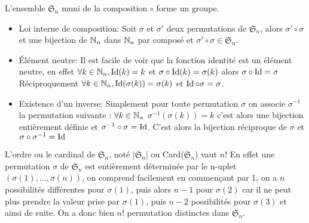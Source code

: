 \begin{prop}
    L'ensemble $\mathfrak{S}_n$ muni de la composition $\circ$ forme un groupe.
\tcblower
\begin{itemize}
\item Loi interne de composition: Soit $\sigma$ et $\sigma'$ deux permutations de $\mathfrak{S}_n$,
alors $\sigma'\circ\sigma$ et une bijection de $\mathbb{N}_n$ dans $\mathbb{N}_n$ par composé et $\sigma'\circ\sigma\in\mathfrak{S}_n$.

\item Élément neutre: Il est facile de voir que la fonction identité est un élément neutre, en effet $\forall k \in \mathbb{N}_n,\operatorname{Id}(k)=k$ et $\sigma\circ\operatorname{Id}(k)=\sigma(k)$ alors $\sigma\circ\operatorname{Id}=\sigma$
Réciproquement $\forall k \in \mathbb{N}_n,\operatorname{Id}(\sigma(k))=\sigma(k)$ et $\operatorname{Id}\circ\sigma=\sigma$.

\item Existence d'un inverse: Simplement pour toute permutation $\sigma$ on associe $\sigma^{-1}$ la permutation suivante : $\forall k \in \mathbb{N}_n$ $\sigma^{-1}(\sigma(k))=k$ c'est alors une bijection entièrement définie et $\sigma^{-1}\circ\sigma=\operatorname{Id}$. C'est alors la bijection réciproque de $\sigma$ et $\sigma\circ\sigma^{-1}=\operatorname{Id}$
\end{itemize}
\end{prop}

\begin{prop}
L'ordre ou le cardinal de $\mathfrak{S}_n$, noté $\vert \mathfrak{S}_n \vert$ ou Card($\mathfrak{S}_n$) vaut $n!$
\tcblower
En effet une permutation $\sigma$ de $\mathfrak{S}_n$ est entièrement déterminée par le n-uplet $(\sigma(1),\dots,\sigma(n))$, on comprend facilement en commençant par 1, on a $n$ possibilités différentes pour $\sigma(1)$, puis alors $n-1$ pour $\sigma(2)$ car il ne peut plus prendre la valeur prise par $\sigma(1)$, puis $n-2$ possibilités pour $\sigma(3)$ et ainsi de suite.
On a donc bien $n!$ permutation distinctes dans $\mathfrak{S}_n$.
\end{prop}

